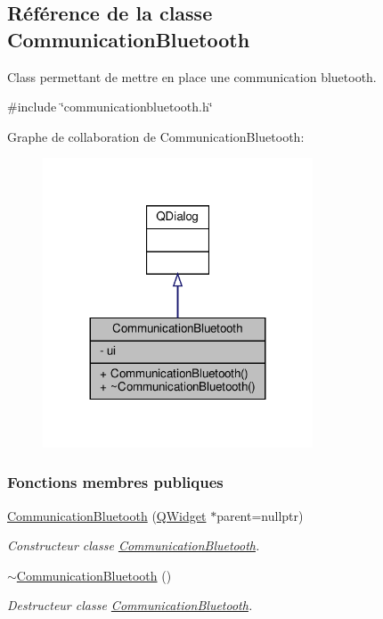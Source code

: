 \hypertarget{class_communication_bluetooth}{}\subsection{Référence de la classe Communication\+Bluetooth}
\label{class_communication_bluetooth}


Class permettant de mettre en place une communication bluetooth.  




{\ttfamily \#include \char`\"{}communicationbluetooth.\+h\char`\"{}}



Graphe de collaboration de Communication\+Bluetooth\+:
\nopagebreak
\begin{figure}[H]
\begin{center}
\leavevmode
\includegraphics[width=227pt]{class_communication_bluetooth__coll__graph}
\end{center}
\end{figure}
\subsubsection*{Fonctions membres publiques}
\begin{DoxyCompactItemize}
\item 
\hyperlink{class_communication_bluetooth_a30f88d1710eb41d9c8c4b390b5c7b6f7}{Communication\+Bluetooth} (\hyperlink{class_q_widget}{Q\+Widget} $\ast$parent=nullptr)
\begin{DoxyCompactList}\small\item\em Constructeur classe \hyperlink{class_communication_bluetooth}{Communication\+Bluetooth}. \end{DoxyCompactList}\item 
\hyperlink{class_communication_bluetooth_a13c72d24359f40c204e94f3ef1ab6fd3}{$\sim$\+Communication\+Bluetooth} ()
\begin{DoxyCompactList}\small\item\em Destructeur classe \hyperlink{class_communication_bluetooth}{Communication\+Bluetooth}. \end{DoxyCompactList}\end{DoxyCompactItemize}

